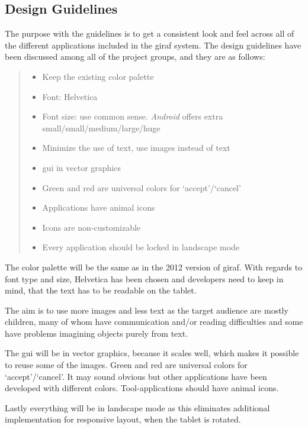 \subsection{Design Guidelines}
\label{sub:designGuidelines}
The purpose with the guidelines is to get a consistent look and feel across all of the different applications included in the \ac{giraf} system.
The design guidelines have been discussed among all of the project groups, and they are as follows:

\begin{quote}
\begin{itemize}
\item Keep the existing color palette
\item Font: Helvetica
\item Font size: use common sense. \emph{Android} offers extra small/small/medium/large/huge
\item Minimize the use of text, use images instead of text
\item \ac{gui} in vector graphics
\item Green and red are universal colors for `accept'/`cancel'
\item Applications have animal icons
\item Icons are non-customizable
\item Every application should be locked in landscape mode
\end{itemize}
\end{quote}

The color palette will be the same as in the 2012 version of \ac{giraf}. With regards to font type and size, Helvetica has been chosen and developers need to keep in mind, that the text has to be readable on the tablet.

The aim is to use more images and less text as the target audience are mostly children, many of whom have communication and/or reading difficulties and some have problems imagining objects purely from text.

The \ac{gui} will be in vector graphics, because it scales well, which makes it possible to reuse some of the images. Green and red are universal colors for `accept'/`cancel'. It may sound obvious but other applications have been developed with different colors.
Tool-applications should have animal icons.

Lastly everything will be in landscape mode as this eliminates additional implementation for responsive layout, when the tablet is rotated.
